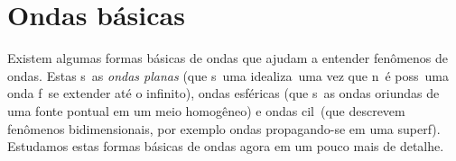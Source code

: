
\chapter{Ondas b\'asicas}

Existem algumas formas b\'asicas de ondas que ajudam a entender
fen\^omenos de ondas. Estas s\ao\ as {\it ondas planas} (que s\ao\ uma
idealiza\cao\, uma vez que n\ao\ \'e poss\ivel\ uma onda f\isica\ se
extender at\'e o infinito), ondas esf\'ericas (que s\ao\ as ondas
oriundas de uma fonte pontual em um meio homog\^eneo) e ondas
cil\indricas\ (que descrevem fen\^omenos bidimensionais, por exemplo
ondas propagando-se em uma superf\icie). Estudamos estas formas
b\'asicas de ondas agora em um pouco mais de detalhe.
